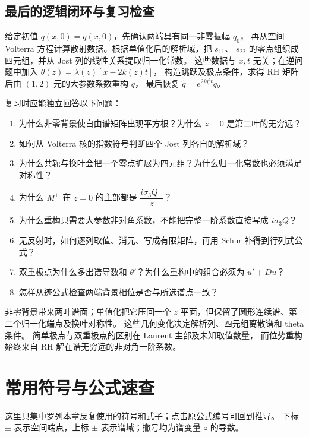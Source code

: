 \documentclass[lang=cn,scheme=chinese,mode=simple,device=normal,color=blue,
math=cm,thmcnt=section,12pt]{elegantbook}
\begin{document}
\section*{最后的逻辑闭环与复习检查}
给定初值 $\widetilde q(x,0)=q(x,0)$，先确认两端具有同一非零振幅 $q_0$，
再从空间 Volterra 方程计算散射数据。根据单值化后的解析域，把 $s_{11}$、
$s_{22}$ 的零点组织成四元组，并从 Jost 列的线性关系提取归一化常数。
这些数据与 $x,t$ 无关；在逆问题中加入 $\theta(z)=\lambda(z)[x-2k(z)t]$，
构造跳跃及极点条件，求得 RH 矩阵后由 $(1,2)$ 元的大参数系数重构 $q$，
最后恢复 $\widetilde q=e^{2iq_0^2t}q$。

复习时应能独立回答以下问题：
\begin{enumerate}
    \item 为什么非零背景使自由谱矩阵出现平方根？为什么 $z=0$ 是第二叶的无穷远？
    \item 如何从 Volterra 核的指数符号判断四个 Jost 列各自的解析域？
    \item 为什么共轭与换叶会把一个零点扩展为四元组？为什么归一化常数也必须满足对称性？
    \item 为什么 $M^\pm$ 在 $z=0$ 的主部都是 $\dfrac{i\sigma_3Q_-}{z}$？
    \item 为什么重构只需要大参数非对角系数，不能把完整一阶系数直接写成 $i\sigma_3Q$？
    \item 无反射时，如何逐列取值、消元、写成有限矩阵，再用 Schur 补得到行列式公式？
    \item 双重极点为什么多出谱导数和 $\theta'$？为什么重构中的组合必须为 $u'+Du$？
    \item 怎样从迹公式检查两端背景相位是否与所选谱点一致？
\end{enumerate}
\begin{callout}[本章最应记住的结论]
    非零背景带来两叶谱面；单值化把它压回一个 $z$ 平面，但保留了圆形连续谱、第二个归一化端点及换叶对称性。
    这些几何变化决定解析列、四元组离散谱和 theta 条件。
    简单极点与双重极点的区别在 Laurent 主部及未知取值数量，
    而位势重构始终来自 RH 解在谱无穷远的非对角一阶系数。
\end{callout}

\chapter*{常用符号与公式速查}
\thispagestyle{fancy}
这里只集中罗列本章反复使用的符号和式子；点击原公式编号可回到推导。
下标 $\pm$ 表示空间端点，上标 $\pm$ 表示谱域；撇号均为谱变量 $z$ 的导数。
\newcommand{\quickentry}[2]{\Needspace{4\baselineskip}\par\noindent\textbf{#1}\quad #2\nopagebreak}
\newcommand{\quickgroup}[1]{\Needspace{9\baselineskip}\section*{#1}\phantomsection\addcontentsline{toc}{section}{#1}}
\end{document}
